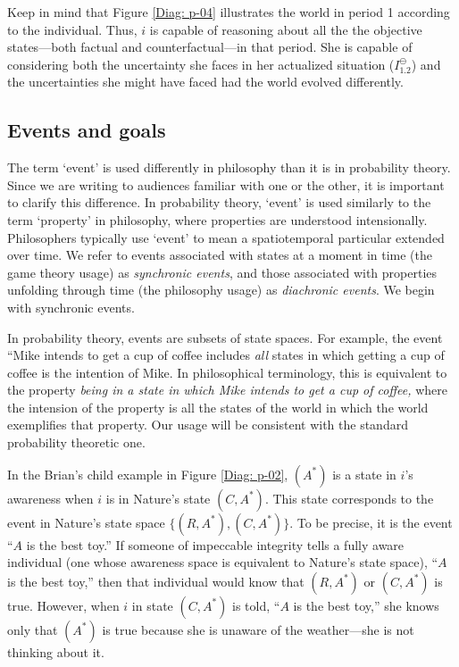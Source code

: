 \documentclass[
11pt,
titlepage,
reqno,
]{article}%
\theoremstyle{definition}
\begin{document}
Keep in mind that Figure \ref{Diag: p-04} illustrates the world in period 1 according to the individual.
Thus, $i$ is capable of reasoning about all the the objective states---both factual and counterfactual---in that period.
She is capable of considering both the uncertainty she faces in her actualized situation ($I^\ominus_{1.2}$) and the uncertainties she might have faced had the world evolved differently.  
	
	
\subsection{Events and goals}
	
The term `event' is used differently in philosophy than it is in probability theory. 
Since we are writing to audiences familiar with one or the other, it is important to clarify this difference. 
In probability theory, `event' is used similarly to the term `property' in philosophy, where properties are understood intensionally. 
Philosophers typically use `event' to mean a spatiotemporal particular extended over time. 
We refer to events associated with states at a moment in time (the game theory usage) as \textit{synchronic events}, and those associated with properties unfolding through time (the philosophy usage) as \textit{diachronic events}.
We begin with synchronic events.
	
In probability theory, events are subsets of state spaces. 
For example, the event ``Mike intends to get a cup of coffee includes \textit{all} states in which getting a cup of coffee is the intention of Mike. 
In philosophical terminology, this is equivalent to the property \textit{being in a state in which Mike intends to get a cup of coffee,} where the intension of the property is all the states of the world in which the world exemplifies that property.
Our usage will be consistent with the standard probability theoretic one.
	
In the Brian's child example in Figure \ref{Diag: p-02}, $(A^\ast)$ is a state in $i$'s awareness when $i$ is in Nature's state $(C,A^\ast)$.
This state corresponds to the event in Nature's state space $\{(R,A^\ast),(C,A^\ast)\}$. 
To be precise, it is the event ``$A$ is the best toy.'' 
If someone of impeccable integrity tells a fully aware individual (one whose awareness space is equivalent to Nature's state space), ``$A$ is the best toy,'' then that individual would know that   $(R,A^\ast)$ or $(C,A^\ast)$ is true.
However, when $i$ in state $(C,A^\ast)$ is told, ``$A$ is the best toy,'' she  knows only that $(A^\ast)$ is true because she is unaware of the weather---she is not thinking about it.
	
\end{document}
